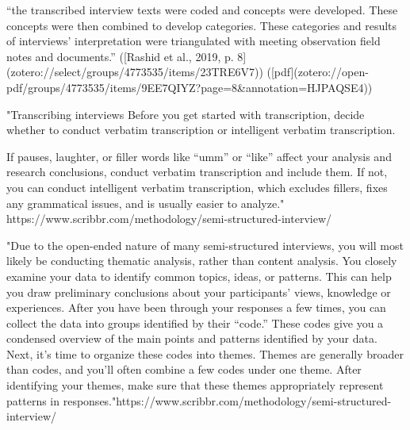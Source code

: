 “the transcribed interview texts were coded and concepts were developed. These concepts were then combined to develop categories. These categories and results of interviews’ interpretation were triangulated with meeting observation field notes and documents.” ([Rashid et al., 2019, p. 8](zotero://select/groups/4773535/items/23TRE6V7)) ([pdf](zotero://open-pdf/groups/4773535/items/9EE7QIYZ?page=8&annotation=HJPAQSE4))


"Transcribing interviews
Before you get started with transcription, decide whether to conduct verbatim transcription or intelligent verbatim transcription.

If pauses, laughter, or filler words like “umm” or “like” affect your analysis and research conclusions, conduct verbatim transcription and include them.
If not, you can conduct intelligent verbatim transcription, which excludes fillers, fixes any grammatical issues, and is usually easier to analyze." https://www.scribbr.com/methodology/semi-structured-interview/


"Due to the open-ended nature of many semi-structured interviews, you will most likely be conducting thematic analysis, rather than content analysis.
You closely examine your data to identify common topics, ideas, or patterns. This can help you draw preliminary conclusions about your participants’ views, knowledge or experiences.
After you have been through your responses a few times, you can collect the data into groups identified by their “code.” These codes give you a condensed overview of the main points and patterns identified by your data.
Next, it’s time to organize these codes into themes. Themes are generally broader than codes, and you’ll often combine a few codes under one theme. After identifying your themes, make sure that these themes appropriately represent patterns in responses."https://www.scribbr.com/methodology/semi-structured-interview/

